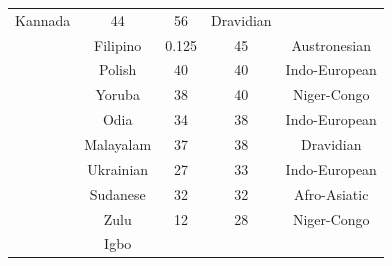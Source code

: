 {\begin{tabular}{|c|c|c|c|c|}
Kannada &
	

44 &
	

56 &
	

Dravidian \\

	\thetablecount\stepcounter{tablecount} &
Filipino &
	

0.125 &
	

45 &
	

Austronesian \\

	\thetablecount\stepcounter{tablecount} &
Polish &
	

40 &
	

40 &
	

Indo-European \\
	\thetablecount\stepcounter{tablecount} &

Yoruba &
	

38 &
	

40 &
	

Niger-Congo \\
	\thetablecount\stepcounter{tablecount} &

Odia &
	

34 &
	

38 &
	

Indo-European \\

	\thetablecount\stepcounter{tablecount} &
Malayalam &
	

37 &
	

38 &
	

Dravidian \\
	\thetablecount\stepcounter{tablecount} &

Ukrainian &
	

27 &
	

33 &
	

Indo-European \\
	\thetablecount\stepcounter{tablecount} &

Sudanese &
	

32 &
	

32 &
	

Afro-Asiatic \\
	\thetablecount\stepcounter{tablecount} &

Zulu &
	

12 &
	

28 &
	

Niger-Congo \\
	\thetablecount\stepcounter{tablecount} &

Igbo &
	


\end{tabular}}
